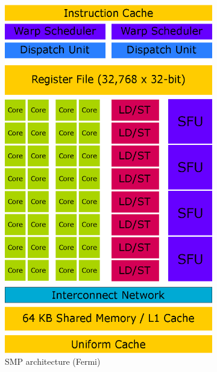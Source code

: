 \begin{figure}[p]
\centering
\begin{subfigure}{0.49\textwidth}
  \centering
  \includegraphics[width=0.8\linewidth]{img/SMPArchitecture.eps}
  \caption{SMP architecture (Fermi)}
  \label{fig:smparchitecture}
\end{subfigure}
\begin{subfigure}{0.49\textwidth}
  \centering

\end{subfigure}
\end{figure}

